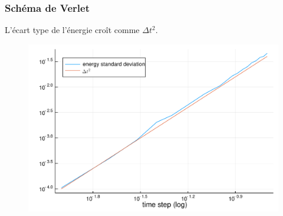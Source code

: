 \begin{frame}

    \frametitle{Schéma de Verlet}

    L'écart type de l'énergie croît comme $\Delta t^2$.

    \begin{figure}
        \includegraphics[scale=0.4]{plots/verlet_energy_spread.pdf}
    \end{figure}

\end{frame}

